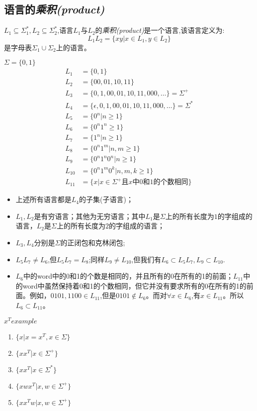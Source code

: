 \subsection{语言的\emph{乘积(product)}}
$L_1\subseteq \Sigma_1^{\ast},L_2\subseteq\Sigma_2^{\ast}$,语言$L_1$与$L_2$的\emph{乘积(product)}是一个语言,该语言定义为:
\[L_1L_2=\{xy|x\in L_1,y\in L_2\}\]
是字母表$\Sigma_1\cup\Sigma_2$上的语言。
\begin{example} $\Sigma = \{0,1\}$
	\begin{align*}
	L_1 &=\{0,1\}\\
	L_2 &=\{00,01,10,11\} \\
	L_3 &=\{0,1,00,01,10,11,000,\dots\} =\Sigma^{+} \\
	L_4 &=\{\epsilon,0,1,00,01,10,11,000,\dots\}=\Sigma^{\ast} \\
	L_5 &=\{0^n|n\geq 1\} \\
	L_6 &=\{0^n1^n\geq 1\} \\
	L_7 &=\{1^n|n\geq 1\} \\
	L_8 &=\{0^n1^m|n,m\geq 1\} \\
	L_9 &=\{0^n1^n0^n|n\geq 1\} \\
	L_{10} &=\{0^n1^m0^k|n,m,k\geq 1\} \\
	L_{11}  &=\{x|x\in\Sigma^{+}\text{且$x$中$0$和$1$的个数相同}\}
	\end{align*}
	\begin{itemize}
		\item 上述所有语言都是$L_4$的子集(子语言)；
		\item $L_1,L_2$是有穷语言；其他为无穷语言；其中$L_1$是$\Sigma$上的所有长度为$1$的字组成的语言，$L_2$是$\Sigma$上的所有长度为$2$的字组成的语言；
		\item $L_3,L_4$分别是$\Sigma$的正闭包和克林闭包;
		\item $L_5L_7\ne L_6$,但$L_5L_7=L_8$;同样$L_9\ne L_{10}$,但我们有$L_6\subset L_5L_7, L_9\subset L_{10}$.
		\item $L_6$中的word中的0和1的个数是相同的，并且所有的0在所有的1的前面；$L_{11}$中的word中虽然保持着0和1的个数相同，但它并没有要求所有的0在所有的1的前面。例如，$0101,1100\in L_{11}$,但是$0101\notin L_6$。而对$\forall x\in L_6$,有$x \in L_{11}$。所以$L_6\subset L_{11}$。
	\end{itemize}
\end{example}

\begin{example} $x^T example$
	\begin{enumerate}
		\item $\{x|x=x^T,x\in\Sigma\}$
		\item $\{xx^T|x\in\Sigma^{+}\}$
		\item $\{xx^T|x\in\Sigma^{\ast}\}$
		\item $\{xwx^T|x,w\in\Sigma^{+}\}$
		\item $\{xx^Tw|x,w\in\Sigma^{+}\}$
	\end{enumerate}
\end{example}

